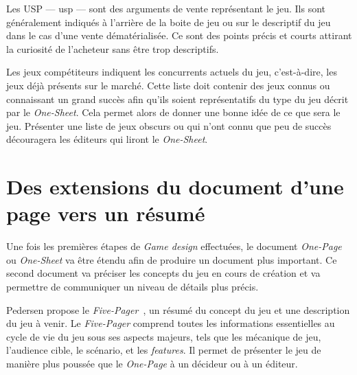 
Les USP --- \gls{usp} --- sont des arguments de vente représentant le jeu.
Ils sont g\'en\'eralement indiqu\'es à l'arrière de la boite de jeu ou sur le descriptif du jeu dans le cas d'une vente dématérialisée.
Ce sont des points précis et courts attirant la curiosité de l'acheteur sans être trop descriptifs. 



Les jeux compétiteurs indiquent les concurrents actuels du jeu, c'est-\`a-dire, les jeux déjà présents sur le marché.
Cette liste doit contenir des jeux connus ou connaissant un grand succès afin qu'ils soient représentatifs du type du jeu d\'ecrit par le \emph{One-Sheet}.
Cela permet alors de donner une bonne idée de ce que sera le jeu.
Présenter une liste de jeux obscurs ou qui n'ont connu que peu de succès découragera les éditeurs qui liront le \emph{One-Sheet}.




\section{Des extensions du document d'une page vers un résumé}
Une fois les premières étapes de \emph{Game design} effectuées, le document \emph{One-Page} ou \emph{One-Sheet} va être étendu afin de produire un document plus important.
Ce second document va préciser les concepts du jeu en cours de création et va permettre de communiquer un niveau de détails plus précis.

Pedersen propose le \emph{Five-Pager}~\cite{GD_foundations_pedersen}, un résumé du concept du jeu et une description du jeu à venir.
Le \emph{Five-Pager} comprend toutes les informations essentielles au cycle de vie du jeu sous ses aspects majeurs, tels que les mécanique de jeu, l'audience cible, le scénario, et les \emph{features}.
Il permet de présenter le jeu de manière plus poussée que le \emph{One-Page} à un décideur ou à un éditeur.



